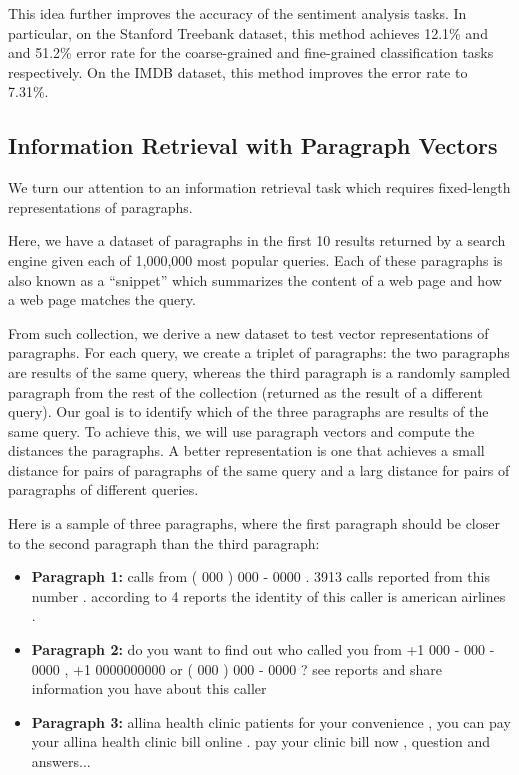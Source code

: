\documentclass{article}
\begin{document}
This idea further improves the accuracy of the sentiment analysis
tasks. In particular, on the Stanford Treebank dataset, this method
achieves 12.1\% and and 51.2\% error rate for the coarse-grained and  fine-grained classification tasks respectively. On the IMDB dataset,
this method improves the error rate to 7.31\%.
\fi

\subsection{Information Retrieval with Paragraph Vectors}
We turn our attention to an information retrieval task which requires
fixed-length representations of paragraphs.

Here, we have a dataset of paragraphs in the first 10 results returned
by a search engine given each of 1,000,000 most popular queries. Each
of these paragraphs is also known as a ``snippet'' which summarizes the
content of a web page and how a web page matches the query.

From such collection, we derive a new dataset to test vector
representations of paragraphs. For each query, we create a triplet of
paragraphs: the two paragraphs are results of the same query, whereas
the third paragraph is a randomly sampled paragraph from the rest of
the collection (returned as the result of a different query). Our goal
is to identify which of the three paragraphs are results of the same
query.  To achieve this, we will use paragraph vectors and compute the
distances the paragraphs. A better representation is one that achieves
a small distance for pairs of paragraphs of the same query and a larg
distance for pairs of paragraphs of different queries.

Here is a sample of three paragraphs, where the first paragraph should be
closer to the second paragraph than the third paragraph:

\begin{itemize}
\item {\bf Paragraph 1:}
calls from  ( 000 )  000 - 0000 .  3913 calls reported from this number .  according to 4  reports the identity of this caller is american airlines .  \item {\bf Paragraph 2:}
do you want to find out who called you from +1 000 - 000 - 0000 ,  +1 0000000000  or  ( 000 )  000 - 0000 ?  see reports and share information you have about this caller
\item {\bf Paragraph 3:}
allina health clinic patients for your convenience ,  you can pay your allina health  clinic bill online .  pay your clinic bill now ,  question and answers...
\end{itemize}
\end{document}
